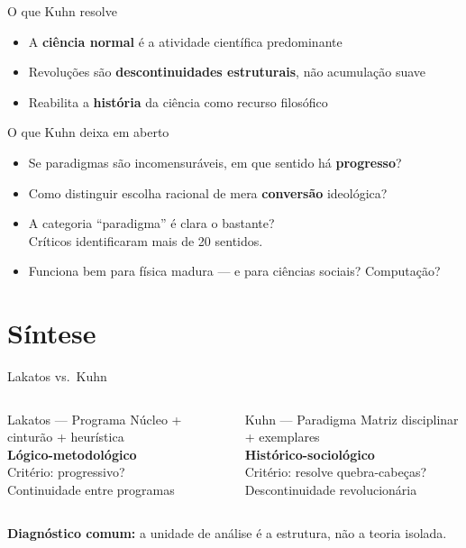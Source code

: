 \documentclass[aspectratio=169]{beamer}
\newcommand{\impt}[1]{\textcolor{maccent}{\textbf{#1}}}
\newcommand{\ntc}[1]{\textcolor{mprimary}{#1}}
\begin{document}
\begin{frame}{O que Kuhn resolve}
\begin{itemize}
  \item A \impt{ciência normal} é a atividade científica predominante
  \pause
  \item Revoluções são \impt{descontinuidades estruturais}, não acumulação suave
  \pause
  \item Reabilita a \impt{história} da ciência como recurso filosófico
\end{itemize}
\end{frame}

\begin{frame}{O que Kuhn deixa em aberto}
\begin{itemize}
  \item Se paradigmas são incomensuráveis, em que sentido há \impt{progresso}?
  \pause
  \vspace{0.2cm}
  \item Como distinguir escolha racional de mera \impt{conversão} ideológica?
  \pause
  \vspace{0.2cm}
  \item A categoria ``paradigma'' é clara o bastante? \\
  \ntc{Críticos identificaram mais de 20 sentidos.}
  \pause
  \vspace{0.2cm}
  \item Funciona bem para física madura --- e para ciências sociais? Computação?
\end{itemize}
\end{frame}

\section{Síntese}

\begin{frame}{Lakatos vs.\ Kuhn}
\begin{columns}[t]
\begin{block}{Lakatos --- Programa}
Núcleo + cinturão + heurística \\[0.15cm]
\impt{Lógico-metodológico} \\[0.15cm]
Critério: progressivo? \\[0.15cm]
\ntc{Continuidade} entre programas
\end{block}

\begin{block}{Kuhn --- Paradigma}
Matriz disciplinar + exemplares \\[0.15cm]
\impt{Histórico-sociológico} \\[0.15cm]
Critério: resolve quebra-cabeças? \\[0.15cm]
\ntc{Descontinuidade} revolucionária
\end{block}
\end{columns}
\vspace{0.5cm}
\pause
\impt{Diagnóstico comum:} a unidade de análise é a estrutura, não a teoria isolada.
\end{frame}
\end{document}
